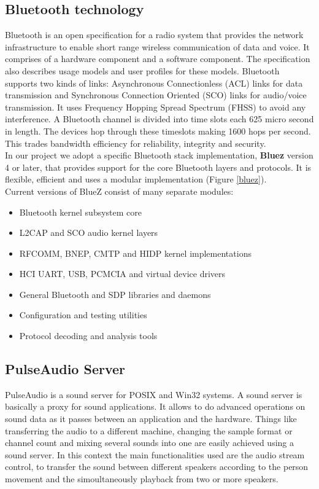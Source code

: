 \documentclass[conference]{IEEEtran}
\begin{document}
\subsection{Bluetooth technology}
Bluetooth is an open specification for a radio system that provides the network infrastructure to enable short range wireless communication of data and voice. It comprises of a hardware component and a software component. The specification also describes usage models and user profiles for these models.
Bluetooth supports two kinds of links: Asynchronous Connectionless (ACL) links for data transmission and Synchronous Connection Oriented (SCO) links for audio/voice transmission. It uses Frequency Hopping Spread Spectrum (FHSS) to avoid any interference. A Bluetooth channel is divided into time slots each 625 micro second in length. The devices hop through these timeslots making 1600 hops per second. This trades bandwidth efficiency for reliability, integrity and security.
\\
In our project we adopt a specific Bluetooth stack implementation, \textbf{Bluez} version 4 or later, that provides support for the core Bluetooth layers and protocols. It is flexible, efficient and uses a modular implementation (Figure \ref{bluez}). \\

Current versions of BlueZ consist of many separate modules:
\begin{itemize}
\item Bluetooth kernel subsystem core
\item L2CAP and SCO audio kernel layers
\item RFCOMM, BNEP, CMTP and HIDP kernel implementations
\item HCI UART, USB, PCMCIA and virtual device drivers
\item General Bluetooth and SDP libraries and daemons
\item Configuration and testing utilities
\item Protocol decoding and analysis tools
\end{itemize}


\subsection{PulseAudio Server}
PulseAudio is a sound server for POSIX and Win32 systems. A sound server is basically a proxy for sound applications. It allows to do advanced operations on sound data as it passes between an application and the hardware. Things like transferring the audio to a different machine, changing the sample format or channel count and mixing several sounds into one are easily achieved using a sound server. In this context the main functionalities used are the audio stream control, to transfer the sound between different speakers according to the person movement and the simoultaneously playback from two or more speakers.
\end{document}
